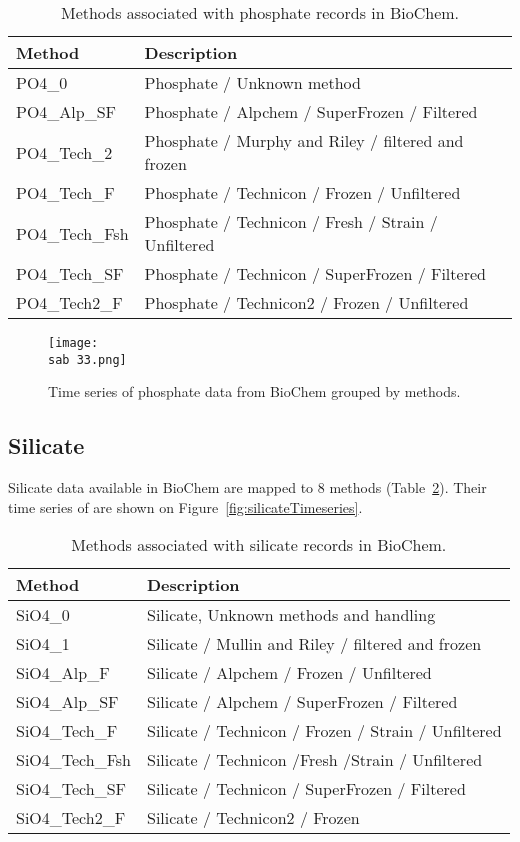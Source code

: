 \documentclass[letterpaper,portrait,11pt]{scrartcl}
\numberwithin{equation}{section}		%
\numberwithin{figure}{section}		%
\numberwithin{table}{section}				%
\newcommand{\ecomod}{\string~/ecomod_data/}   %
\newcommand{\sab}{\ecomod/mpa/sab/}   %
\begin{document}
\begin{appendices}
\begin{table}[h]
  \caption{Methods associated with phosphate records in BioChem.}
  \label{table:PhosphateMethods}
  \begin{tabular}{ll}
    Method & Description \\ \hline
    PO4\_0 & Phosphate / Unknown method  \\ 
    PO4\_Alp\_SF & Phosphate / Alpchem / SuperFrozen / Filtered \\ 
    PO4\_Tech\_2 & Phosphate / Murphy and Riley / filtered and frozen \\ 
    PO4\_Tech\_F & Phosphate / Technicon / Frozen / Unfiltered \\ 
    PO4\_Tech\_Fsh & Phosphate / Technicon / Fresh / Strain / Unfiltered \\
    PO4\_Tech\_SF & Phosphate / Technicon / SuperFrozen / Filtered \\
    PO4\_Tech2\_F & Phosphate / Technicon2 / Frozen / Unfiltered \\
  \end{tabular}
\end{table}


\begin{figure}[h]
  \centering
  \texttt{[image: \\sab 33.png]}
  \caption{Time series of phosphate data from BioChem grouped by methods.}
  \label{fig:PhosphateTimeseries}
\end{figure}


\subsection{Silicate}

Silicate data available in BioChem are mapped to 8 methods (Table~\ref{table:SilicateMethods}). Their time series of are shown on Figure~\ref{fig:silicateTimeseries}.

\begin{table}[h]
  \label{table:SilicateMethods}
  \caption{Methods associated with silicate records in BioChem.}
  \begin{tabular}{ll}
    Method & Description \\ \hline
    SiO4\_0 & Silicate, Unknown methods and handling \\
    SiO4\_1 & Silicate / Mullin and Riley / filtered and frozen \\
    SiO4\_Alp\_F & Silicate / Alpchem / Frozen / Unfiltered \\
    SiO4\_Alp\_SF & Silicate / Alpchem / SuperFrozen / Filtered \\
    SiO4\_Tech\_F & Silicate / Technicon / Frozen / Strain / Unfiltered \\
    SiO4\_Tech\_Fsh & Silicate / Technicon /Fresh /Strain / Unfiltered \\
    SiO4\_Tech\_SF & Silicate / Technicon / SuperFrozen / Filtered \\
    SiO4\_Tech2\_F & Silicate / Technicon2 / Frozen \\
  \end{tabular}
\end{table}



\end{appendices}
\end{document}
